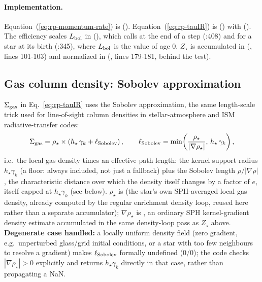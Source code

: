 \paragraph{Implementation.} Equation~(\ref{eq:rp-momentum-rate}) is
().
Equation~(\ref{eq:rp-tauIR}) is 
() with 
(). The efficiency scales $L_{\rm bol}$ in
(), which
 calls at the end of a step (:408) and for a
star at its birth (:345), where $L_{\rm bol}$ is the value of age $0$. $Z_\star$ is
accumulated in 
(, lines 101-103) and normalized in
 (,
lines 179-181, behind the  test).

\subsection{Gas column density: Sobolev approximation}
\label{sec:rp-sobolev}

$\Sigma_{\rm gas}$ in Eq.~\ref{eq:rp-tauIR} uses the Sobolev
approximation, the same length-scale trick used for line-of-sight
column densities in stellar-atmosphere and ISM radiative-transfer
codes:
\begin{equation}
  \Sigma_{\rm gas} = \rho_\star \times
  \left(h_\star\,\gamma_k + \ell_{\rm Sobolev}\right), \qquad
  \ell_{\rm Sobolev} = \min\!\left(\frac{\rho_\star}{|\nabla\rho_\star|},\,
  h_\star\,\gamma_k\right),
  \label{eq:rp-sobolev}
\end{equation}
i.e.\
the local gas density times an effective path length: the kernel
support radius $h_\star\gamma_k$ (a floor: always included, not just
a fallback) plus the Sobolev length $\rho/|\nabla\rho|$, the
characteristic distance over which the density itself changes by a
factor of $e$, itself capped at $h_\star\gamma_k$ (see below). $\rho_\star$ is
\code{enrichment\_weight} (the star's
own SPH-averaged local gas density, already computed by the regular
enrichment density loop, reused here rather than a separate
accumulator); $\nabla\rho_\star$ is
, an ordinary SPH kernel-gradient
density estimate accumulated in the same density-loop pass as $Z_\star$
above. \textbf{Degenerate case handled:} a locally uniform density
field (zero gradient, e.g.\ unperturbed glass/grid initial
conditions, or a star with too few neighbours to resolve a gradient)
makes $\ell_{\rm Sobolev}$ formally undefined (0/0); the code checks
$|\nabla\rho_\star|>0$ explicitly and returns $h_\star\gamma_k$ directly
in that case, rather than propagating a NaN.

